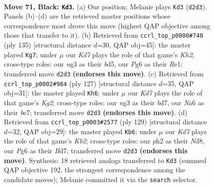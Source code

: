\documentclass[11pt]{article}
\begin{document}
\clearpage

\begin{figure}[p]\centering
\begin{subfigure}{0.46\textwidth}\centering
\resizebox{\linewidth}{!}{%
\newchessgame
\chessboard[
  setfen={8/2r2p2/n5p1/4P2p/b4Pp1/6N1/B2k1K1P/8 b - - 1 71},
  showmover=false,
  pgfstyle=straightmove, color=movearrow, markmove={d2-d3}
]}
\caption{}
\end{subfigure}\hfill
\begin{subfigure}{0.46\textwidth}\centering
\resizebox{\linewidth}{!}{%
\newchessgame
\chessboard[
  setfen={8/5p1k/1p4p1/3B3p/P4N1P/6P1/7K/4r3 b - - 0 68},
  showmover=false,
  pgfstyle=straightmove, color=movearrow, markmove={h7-g7}
]}
\caption{}
\end{subfigure}
\\[4pt]
\begin{subfigure}{0.46\textwidth}\centering
\resizebox{\linewidth}{!}{%
\newchessgame
\chessboard[
  setfen={8/3BB1k1/6p1/3p1pN1/3P1P1P/4n3/5r2/7K b - - 9 64},
  showmover=false,
  pgfstyle=straightmove, color=movearrow, markmove={g7-h6}
]}
\caption{}
\end{subfigure}\hfill
\begin{subfigure}{0.46\textwidth}\centering
\resizebox{\linewidth}{!}{%
\newchessgame
\chessboard[
  setfen={3n4/1k1b4/4p2p/4P1p1/3N2P1/4K2P/B7/8 b - - 9 65},
  showmover=false,
  pgfstyle=straightmove, color=movearrow, markmove={b7-b6}
]}
\caption{}
\end{subfigure}
\caption{\textbf{Move 71, Black: \texttt{Kd3}.} (a) Our position; Melanie plays \texttt{Kd3} (\texttt{d2d3}). Panels (b)--(d) are the retrieved master positions whose correspondence most drove this move (highest QAP objective among those that transfer to it). (b) Retrieved from \texttt{ccrl\_top\_p0000\#740} (ply 135) [structural distance $d$=30, QAP obj=45]: the master played \texttt{Kg7}; under $\mu$ our \emph{Kd7} plays the role of that game's \emph{Kh2}; cross-type roles: our \emph{n}g3 as their \emph{b}d5, our \emph{P}g6 as their \emph{R}e1; transferred move \texttt{d2d3} \textbf{(endorses this move)}. (c) Retrieved from \texttt{ccrl\_top\_p0002\#984} (ply 127) [structural distance $d$=35, QAP obj=31]: the master played \texttt{Kh6}; under $\mu$ our \emph{Kd7} plays the role of that game's \emph{Kg2}; cross-type roles: our \emph{n}g3 as their \emph{b}d7, our \emph{N}a6 as their \emph{b}e7; transferred move \texttt{d2d3} \textbf{(endorses this move)}. (d) Retrieved from \texttt{ccrl\_top\_p0003\#2577} (ply 129) [structural distance $d$=32, QAP obj=29]: the master played \texttt{Kb6}; under $\mu$ our \emph{Kd7} plays the role of that game's \emph{Kb2}; cross-type roles: our \emph{p}h2 as their \emph{N}d8, our \emph{P}g6 as their \emph{B}d7; transferred move \texttt{d2d3} \textbf{(endorses this move)}. Synthesis: 18 retrieved analogs transferred to \texttt{Kd3} (summed QAP objective 192, the strongest correspondence among the candidate moves); Melanie committed it via the \texttt{search} selector.}
\label{fig:thought-m141}
\end{figure}
\end{document}

